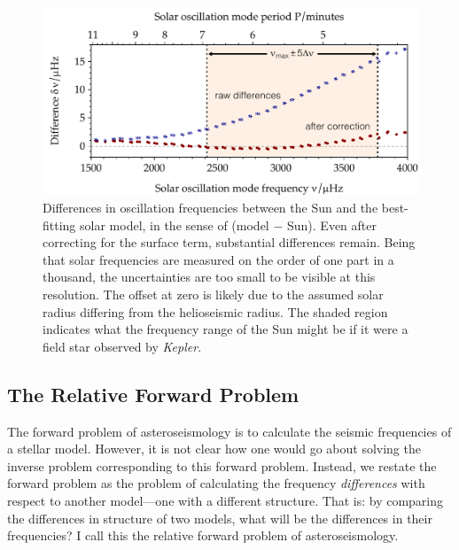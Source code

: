 
\begin{figure}
    \centering
    \includegraphics[width=\textwidth,keepaspectratio]{figs/pulse/freq-diffs-solar.pdf}%
    \caption[The solar surface effect]{Differences in oscillation frequencies between the Sun and the best-fitting solar model, in the sense of (model $-$ Sun). 
    Even after correcting for the surface term, substantial differences remain. 
    Being that solar frequencies are measured on the order of one part in a thousand, the uncertainties are too small to be visible at this resolution. 
    The offset at zero is likely due to the assumed solar radius differing from the helioseismic radius. 
    The shaded region indicates what the frequency range of the Sun might be if it were a field star observed by \emph{Kepler}. 
    \label{fig:solar_freq_diffs}} 
\end{figure} 


\subsection{The Relative Forward Problem} \label{sec:variational}
The forward problem of asteroseismology is to calculate the seismic frequencies of a stellar model. 
However, it is not clear how one would go about solving the inverse problem corresponding to this forward problem. 
Instead, we restate the forward problem as the problem of calculating the frequency \emph{differences} with respect to another model---one with a different structure. 
That is: by comparing the differences in structure of two models, what will be the differences in their frequencies? 
I call this the relative forward problem of asteroseismology. 

